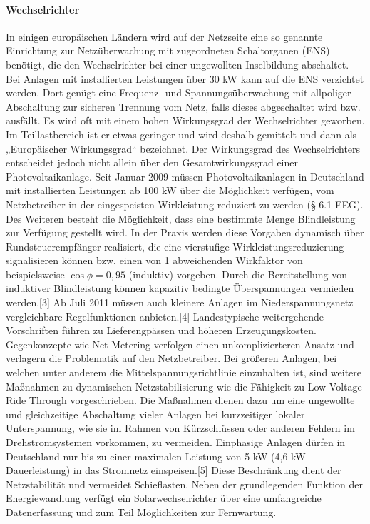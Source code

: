 \paragraph{Wechselrichter}
In einigen europäischen Ländern wird auf der Netzseite eine so genannte Einrichtung zur Netzüberwachung mit zugeordneten Schaltorganen (ENS) benötigt, die den Wechselrichter bei einer ungewollten Inselbildung abschaltet. Bei Anlagen mit installierten Leistungen über 30 \si{kW} kann auf die ENS verzichtet werden. Dort genügt eine Frequenz- und Spannungsüberwachung mit allpoliger Abschaltung zur sicheren Trennung vom Netz, falls dieses abgeschaltet wird bzw. ausfällt. 
Es wird oft mit einem hohen Wirkungsgrad der Wechselrichter geworben. Im Teillastbereich ist er etwas geringer und wird deshalb gemittelt und dann als „Europäischer Wirkungsgrad“ bezeichnet. Der Wirkungsgrad des Wechselrichters entscheidet jedoch nicht allein über den Gesamtwirkungsgrad einer Photovoltaikanlage. 
Seit Januar 2009 müssen Photovoltaikanlagen in Deutschland mit installierten Leistungen ab 100 \si{kW} über die Möglichkeit verfügen, vom Netzbetreiber in der eingespeisten Wirkleistung reduziert zu werden (§ 6.1 EEG). Des Weiteren besteht die Möglichkeit, dass eine bestimmte Menge Blindleistung zur Verfügung gestellt wird. In der Praxis werden diese Vorgaben dynamisch über Rundsteuerempfänger realisiert, die eine vierstufige Wirkleistungsreduzierung signalisieren können bzw. einen von 1 abweichenden Wirkfaktor von beispielsweise $\cos \phi = 0,95$ (induktiv) vorgeben. Durch die Bereitstellung von induktiver Blindleistung können kapazitiv bedingte Überspannungen vermieden werden.[3] 
Ab Juli 2011 müssen auch kleinere Anlagen im Niederspannungsnetz vergleichbare Regelfunktionen anbieten.[4] Landestypische weitergehende Vorschriften führen zu Lieferengpässen und höheren Erzeugungskosten. Gegenkonzepte wie Net Metering verfolgen einen unkomplizierteren Ansatz und verlagern die Problematik auf den Netzbetreiber. 
Bei größeren Anlagen, bei welchen unter anderem die Mittelspannungsrichtlinie einzuhalten ist, sind weitere Maßnahmen zu dynamischen Netzstabilisierung wie die Fähigkeit zu Low-Voltage Ride Through vorgeschrieben. Die Maßnahmen dienen dazu um eine ungewollte und gleichzeitige Abschaltung vieler Anlagen bei kurzzeitiger lokaler Unterspannung, wie sie im Rahmen von Kürzschlüssen oder anderen Fehlern im Drehstromsystemen vorkommen, zu vermeiden. 
Einphasige Anlagen dürfen in Deutschland nur bis zu einer maximalen Leistung von 5 \si{kW} (4,6 \si{kW} Dauerleistung) in das Stromnetz einspeisen.[5] Diese Beschränkung dient der Netzstabilität und vermeidet Schieflasten. Neben der grundlegenden Funktion der Energiewandlung verfügt ein Solarwechselrichter über eine umfangreiche Datenerfassung und zum Teil Möglichkeiten zur Fernwartung. 



